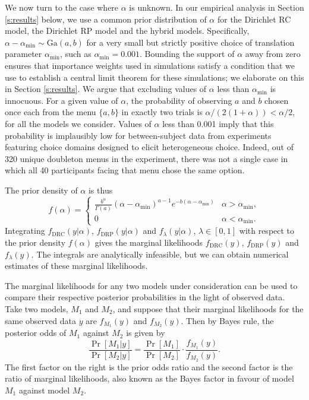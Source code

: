\documentclass[11pt,letter]{article}
\newcommand{\Dpi}{Dirichlet RP model}
\newcommand{\DP}{Dirichlet RC model}
\begin{document}
We now turn to the case where $\alpha$ is unknown.
In our empirical analysis in Section \ref{s:results} below, we use a common prior distribution of $\alpha$ for the \DP{}, the \Dpi{} and the hybrid models.
Specifically, $\alpha - \alpha_\mathrm{min} \sim \mathrm{Ga}(a,b)$ for a very small but strictly positive choice of translation parameter $\alpha_\mathrm{min}$, such as $\alpha_\mathrm{min} = 0.001$.
Bounding the support of $\alpha$ away from zero ensures that importance weights used in simulations satisfy a condition that we use to establish a central limit theorem for these simulations; we elaborate on this in Section \ref{s:results}.
We argue that excluding values of $\alpha$ less than $\alpha_\mathrm{min}$ is innocuous.
For a given value of $\alpha$, the probability of observing $a$ and $b$ chosen once each from the menu $\{a,b\}$ in exactly two trials is $\alpha/(2(1+\alpha)) < \alpha/2$, for all the models we consider.
Values of $\alpha$ less than 0.001 imply that this probability is implausibly low for between-subject data from experiments featuring choice domains designed to elicit heterogeneous choice.
Indeed, out of 320 unique doubleton menus in the experiment, there was not a single case in which all 40 participants facing that menu chose the same option.

The prior density of $\alpha$ is thus
\begin{equation}\label{e:prioralpha}
  f(\alpha) = \begin{cases}
    \frac{b^a}{\Gamma(a)} (\alpha-\alpha_\mathrm{min})^{a-1} e^{-b(\alpha-\alpha_\mathrm{min})} & \alpha > \alpha_\mathrm{min}, \\
    0 & \alpha < \alpha_\mathrm{min}.
  \end{cases}
\end{equation}
Integrating $f_\mathrm{DRC}(y|\alpha)$, $f_\mathrm{DRP}(y|\alpha)$ and $f_\lambda(y|\alpha)$, $\lambda \in [0,1]$ with respect to the prior density $f(\alpha)$ gives the marginal likelihoods $f_\mathrm{DRC}(y)$, $f_\mathrm{DRP}(y)$ and $f_\lambda(y)$.
The integrals are analytically infeasible, but we can obtain numerical estimates of these marginal likelihoods.

The marginal likelihoods for any two models under consideration can be used to compare their respective posterior probabilities in the light of observed data.
Take two models, $M_1$ and $M_2$, and suppose that their marginal likelihoods for the same observed data $y$ are $f_{M_1}(y)$ and $f_{M_2}(y)$.
Then by Bayes rule, the posterior odds of $M_1$ against $M_2$ is given by
\[
  \frac{\Pr[M_1|y]}{\Pr[M_2|y]} = \frac{\Pr[M_1]}{\Pr[M_2]} \cdot \frac{f_{M_1}(y)}{f_{M_2}(y)}.
\]
The first factor on the right is the prior odds ratio and the second factor is the ratio of marginal likelihoods, also known as the Bayes factor in favour of model $M_1$ against model $M_2$.
\end{document}
